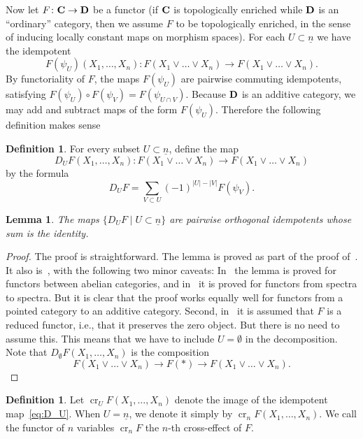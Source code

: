 \documentclass[psamsfonts]{amsart}
\theoremstyle{plain}
\newtheorem{lem}[thm]{Lemma}
\theoremstyle{definition}
\newtheorem{defn}[thm]{Definition}
\theoremstyle{remark}
\newcommand{\catname}[1]{{\normalfont\textbf{#1}}}
\DeclareMathOperator{\ce}{cr}
\begin{document}
Now let $F\colon\catname{C}\to \catname{D}$ be a functor (if $\catname{C}$ is topologically enriched while $\catname{D}$ is an ``ordinary'' category, then we assume $F$ to be topologically enriched, in the sense of inducing locally constant maps on morphism spaces). For each $U\subset \underline{n}$ we have the idempotent
\[
F(\psi_U)(X_1, \ldots, X_n)\colon F(X_1 \vee\ldots\vee X_n)\to F(X_1 \vee\ldots\vee X_n).
\]
By functoriality of $F$, the maps $F(\psi_U)$ are pairwise commuting idempotents, satisfying $F(\psi_U)\circ F(\psi_V)=F(\psi_{U\cap V})$. Because $\catname{D}$ is an additive category, we may add and subtract maps of the form $F(\psi_U)$. Therefore the following definition makes sense
\begin{defn}
For every subset $U\subset \underline{n}$, define the map 
\begin{equation}\label{eq:D_U}
D_UF(X_1, \ldots, X_n)\colon F(X_1 \vee\ldots\vee X_n)\to F(X_1 \vee\ldots\vee X_n)
\end{equation}
by the formula
\[
D_UF=\sum_{V\subset U} (-1)^{|U|-|V|} F(\psi_V).
\]
\end{defn}
\begin{lem}\label{lem:orthogonal}
The maps $\{D_UF\mid U\subset \underline{n}\}$ are pairwise orthogonal idempotents whose sum is the identity.
\end{lem}
\begin{proof}
The proof is straightforward. The lemma is proved as part of the proof of~\cite[Theorem 9.1]{Eilenberg1954}. It also is~\cite[Lemma 3.21]{Arone-Barthel-Heard-Sanders}, with the following  two minor caveats: In~\cite{Eilenberg1954} the lemma is proved for functors between abelian categories, and in~\cite{Arone-Barthel-Heard-Sanders} it is proved for functors from spectra to spectra. But it is clear that the proof works equally well for functors from a pointed category to an additive category. Second, in~\cite{Eilenberg1954} it is assumed that $F$ is a reduced functor, i.e., that it preserves the zero object. But there is no need to assume this. This means that we have to include $U=\emptyset$ in the decomposition. Note that $D_{\emptyset}F(X_1, \ldots, X_n)$ is the composition
\[
F(X_1 \vee\ldots\vee X_n) \to F(*) \to F(X_1 \vee\ldots\vee X_n).
\]
\end{proof}
\begin{defn}\label{def:cross-effects}
Let $\ce_UF(X_1, \ldots, X_n)$ denote the image of the idempotent map~\eqref{eq:D_U}. When $U=\underline{n}$, we denote it simply by $\ce_nF(X_1, \ldots, X_n)$. We call the functor of $n$ variables $\ce_nF$ the $n$-th cross-effect of $F$.
\end{defn}
\end{document}
